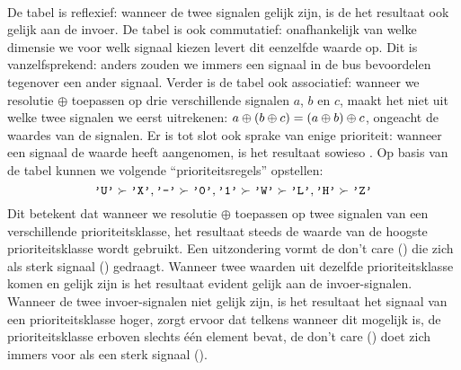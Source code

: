 \paragraph{}
De tabel is reflexief: wanneer de twee signalen gelijk zijn, is de het resultaat ook gelijk aan de invoer. De tabel is ook commutatief: onafhankelijk van welke dimensie we voor welk signaal kiezen levert dit eenzelfde waarde op. Dit is vanzelfsprekend: anders zouden we immers een signaal in de bus bevoordelen tegenover een ander signaal. Verder is de tabel ook associatief: wanneer we resolutie $\oplus$ toepassen op drie verschillende signalen $a$, $b$ en $c$, maakt het niet uit welke twee signalen we eerst uitrekenen: $a\oplus\left( b\oplus c \right)=\left( a\oplus b \right)\oplus c$, ongeacht de waardes van de signalen. Er is tot slot ook sprake van enige prioriteit: wanneer een signaal de waarde  heeft aangenomen, is het resultaat sowieso . Op basis van de tabel kunnen we volgende ``prioriteitsregels'' opstellen:
\begin{equation}
\vhdltermen{'U'}\succ\vhdltermen{'X'},\vhdltermen{'-'}\succ\vhdltermen{'0'},\vhdltermen{'1'}\succ\vhdltermen{'W'}\succ\vhdltermen{'L'},\vhdltermen{'H'}\succ\vhdltermen{'Z'}
\eqnlab{stdlogic-priority}
\end{equation}
Dit betekent dat wanneer we resolutie $\oplus$ toepassen op twee signalen van een verschillende prioriteitsklasse, het resultaat steeds de waarde van de hoogste prioriteitsklasse wordt gebruikt. Een uitzondering vormt de don't care () die zich als sterk signaal () gedraagt. Wanneer twee waarden uit dezelfde prioriteitsklasse komen en gelijk zijn is het resultaat evident gelijk aan de invoer-signalen. Wanneer de twee invoer-signalen niet gelijk zijn, is het resultaat het signaal van een prioriteitsklasse hoger,  zorgt ervoor dat telkens wanneer dit mogelijk is, de prioriteitsklasse erboven slechts \'e\'en element bevat, de don't care () doet zich immers voor als een sterk signaal ().

\paragraph{}

